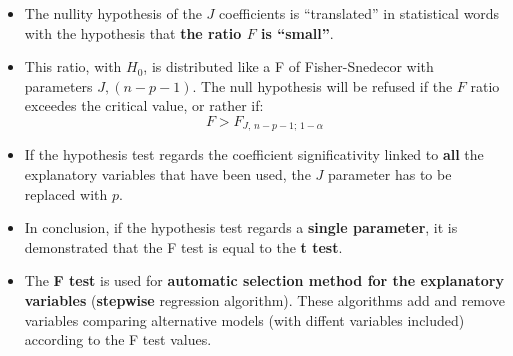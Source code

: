 \begin{frame}
  \vspace*{.75cm}
  \begin{itemize}
    \item The nullity hypothesis of the $ J $ coefficients is ``translated'' in statistical words with the hypothesis that \textbf{the ratio {\boldmath $ F $} is ``small''}. 
    \vspace*{.75cm}
    \item This ratio, with $ H_0 $, is distributed like a F of Fisher-Snedecor with parameters $ J, (n-p-1) $. The null hypothesis will be refused if the $ F $ ratio exceedes the critical value, or rather if:
      $$ F > F_{J,\,n-p-1;\,1-\alpha} $$
  \end{itemize}
\end{frame}

\begin{frame}
  \vspace*{.5cm}
  \begin{itemize}
    \item If the hypothesis test regards the coefficient significativity linked to \textbf{all} the explanatory variables that have been used, the $ J $ parameter has to be replaced with $ p $.
    \vspace*{.25cm}
    \item In conclusion, if the hypothesis test regards a \textbf{single parameter}, it is demonstrated that the F test is equal to the \textbf{t test}.
    \vspace*{.25cm}
    \item The \textbf{F test} is used for \textbf{automatic selection method for the explanatory variables} (\textbf{stepwise} regression algorithm). These algorithms add and remove variables comparing alternative models (with diffent variables included) according to the F test values.
  \end{itemize}
\end{frame}


